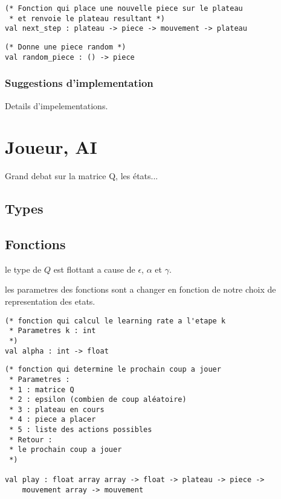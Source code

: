 \documentclass{article}
\begin{document}
\begin{lstlisting}[frame=L]
(* Fonction qui place une nouvelle piece sur le plateau
 * et renvoie le plateau resultant *)
val next_step : plateau -> piece -> mouvement -> plateau
\end{lstlisting}

\begin{lstlisting}[frame=L]
(* Donne une piece random *)
val random_piece : () -> piece
\end{lstlisting}

\subsubsection{Suggestions d'implementation}

Details d'impelementations.

\section{Joueur, AI}

Grand debat sur la matrice Q, les états...

\subsection{Types}

\subsection{Fonctions}

\danger{} le type de \( Q \) est flottant a cause de \( \epsilon \), \( \alpha \) et \( \gamma \).

\noindent
\danger{} les parametres des fonctions sont a changer en fonction de notre
choix de representation des etats.

\begin{lstlisting}[frame=L]
(* fonction qui calcul le learning rate a l'etape k
 * Parametres k : int
 *)
val alpha : int -> float
\end{lstlisting}


\begin{lstlisting}[frame=L]
(* fonction qui determine le prochain coup a jouer
 * Parametres :
 * 1 : matrice Q
 * 2 : epsilon (combien de coup aléatoire)
 * 3 : plateau en cours
 * 4 : piece a placer
 * 5 : liste des actions possibles
 * Retour :
 * le prochain coup a jouer
 *)

val play : float array array -> float -> plateau -> piece ->
	mouvement array -> mouvement
\end{lstlisting}
\end{document}

